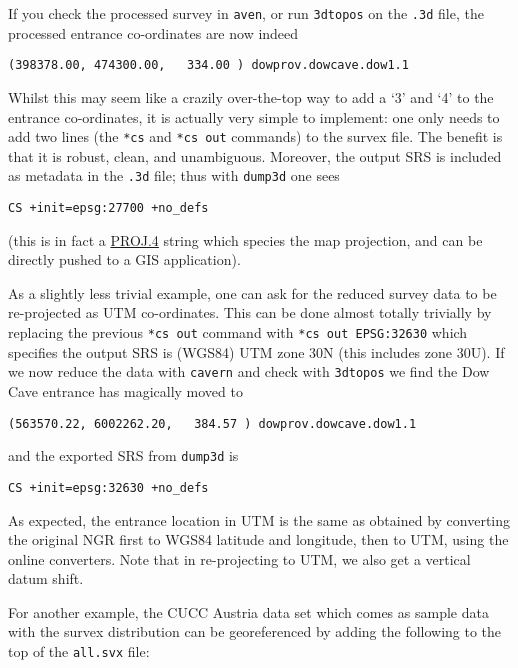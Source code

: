 \documentclass[]{article}
\begin{document}
If you check the processed survey in \verb}aven}, or run
\verb}3dtopos} on the \verb}.3d} file, the processed entrance
co-ordinates are now indeed

\begin{verbatim}
(398378.00, 474300.00,   334.00 ) dowprov.dowcave.dow1.1
\end{verbatim}

Whilst this may seem like a crazily over-the-top way to add a `3' and
`4' to the entrance co-ordinates, it is actually very simple to
implement: one only needs to add two lines (the \verb}*cs} and
\verb}*cs out} commands) to the survex file. The benefit is that it
is robust, clean, and unambiguous. Moreover, the output SRS is included
as metadata in the \verb}.3d} file; thus with \verb}dump3d} one sees

\begin{verbatim}
CS +init=epsg:27700 +no_defs
\end{verbatim}

(this is in fact a \href{http://proj4.org/}{PROJ.4} string which species
the map projection, and can be directly pushed to a GIS application).

As a slightly less trivial example, one can ask for the reduced survey
data to be re-projected as UTM co-ordinates. This can be done almost
totally trivially by replacing the previous \verb}*cs out} command
with \verb}*cs out EPSG:32630} which specifies the output SRS is
(WGS84) UTM zone 30N (this includes zone 30U). If we now reduce the data
with \verb}cavern} and check with \verb}3dtopos} we find the Dow
Cave entrance has magically moved to

\begin{verbatim}
(563570.22, 6002262.20,   384.57 ) dowprov.dowcave.dow1.1
\end{verbatim}

and the exported SRS from \verb}dump3d} is

\begin{verbatim}
CS +init=epsg:32630 +no_defs
\end{verbatim}

As expected, the entrance location in UTM is the same as obtained by
converting the original NGR first to WGS84 latitude and longitude, then
to UTM, using the online converters. Note that in re-projecting to UTM,
we also get a vertical datum shift.

For another example, the CUCC Austria data set which comes as sample
data with the survex distribution can be georeferenced by adding the
following to the top of the \verb}all.svx} file:
\end{document}
